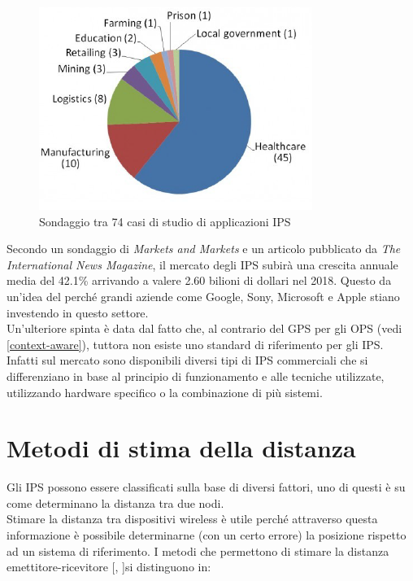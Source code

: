 \begin{figure}[H]  
	\centering 
	\includegraphics[scale=1.2]{ContestoApplicativo/application.png}
	\caption{Sondaggio tra 74 casi di studio di applicazioni IPS \cite{market}}
	\label{fig:surveyApplication}
\end{figure}

Secondo un sondaggio  di \textit{Markets and Markets} e un articolo pubblicato da\textit{ The International News Magazine}, il mercato degli IPS subirà una crescita annuale media del 42.1\% arrivando a valere 2.60 bilioni di dollari nel 2018. Questo da un'idea del perché grandi aziende come Google, Sony, Microsoft e Apple stiano investendo in questo settore.\\
Un'ulteriore spinta è data dal fatto che, al contrario del GPS per gli OPS (vedi \ref{context-aware}), tuttora non esiste uno standard di riferimento per gli IPS. Infatti sul mercato sono disponibili diversi tipi di IPS commerciali che si differenziano in base al principio di funzionamento e alle tecniche utilizzate, utilizzando hardware specifico o la combinazione di più sistemi.\\ 




\section{Metodi di stima della distanza}
\label{metodi_distanza}
Gli IPS possono essere classificati sulla base di diversi fattori, uno di questi è su come determinano la distanza tra due nodi.\\
Stimare \cite{IPS2} la distanza tra dispositivi wireless è utile perché attraverso questa informazione è possibile determinarne (con un certo errore) la posizione rispetto ad un sistema di riferimento. I metodi che permettono di stimare la distanza emettitore-ricevitore [\cite{alg1}, \cite{alg2}]si distinguono in:

